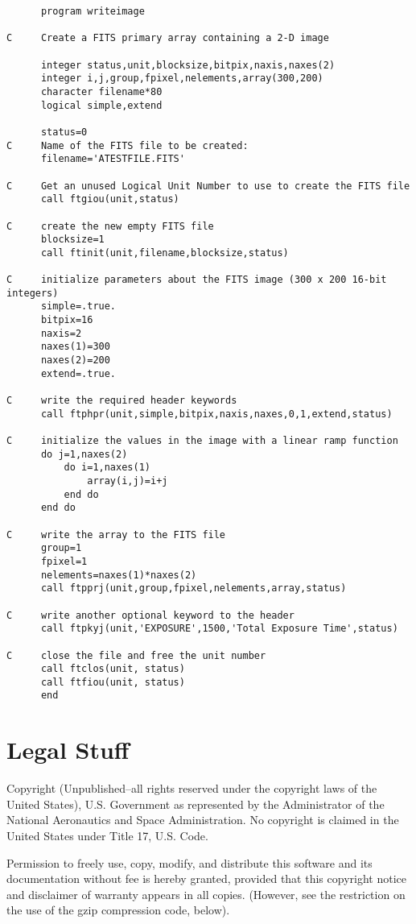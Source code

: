 \documentclass[11pt]{book}
\begin{document}
\begin{verbatim}
      program writeimage

C     Create a FITS primary array containing a 2-D image

      integer status,unit,blocksize,bitpix,naxis,naxes(2)
      integer i,j,group,fpixel,nelements,array(300,200)
      character filename*80
      logical simple,extend

      status=0
C     Name of the FITS file to be created:
      filename='ATESTFILE.FITS'

C     Get an unused Logical Unit Number to use to create the FITS file
      call ftgiou(unit,status)

C     create the new empty FITS file
      blocksize=1
      call ftinit(unit,filename,blocksize,status)

C     initialize parameters about the FITS image (300 x 200 16-bit integers)
      simple=.true.
      bitpix=16
      naxis=2
      naxes(1)=300
      naxes(2)=200
      extend=.true.

C     write the required header keywords
      call ftphpr(unit,simple,bitpix,naxis,naxes,0,1,extend,status)

C     initialize the values in the image with a linear ramp function
      do j=1,naxes(2)
          do i=1,naxes(1)
              array(i,j)=i+j
          end do
      end do

C     write the array to the FITS file
      group=1
      fpixel=1
      nelements=naxes(1)*naxes(2)
      call ftpprj(unit,group,fpixel,nelements,array,status)

C     write another optional keyword to the header
      call ftpkyj(unit,'EXPOSURE',1500,'Total Exposure Time',status)

C     close the file and free the unit number
      call ftclos(unit, status)
      call ftfiou(unit, status)
      end
\end{verbatim}


\section{Legal Stuff}

Copyright (Unpublished--all rights reserved under the copyright laws of
the United States), U.S. Government as represented by the Administrator
of the National Aeronautics and Space Administration.  No copyright is
claimed in the United States under Title 17, U.S. Code.

Permission to freely use, copy, modify, and distribute this software
and its documentation without fee is hereby granted, provided that this
copyright notice and disclaimer of warranty appears in all copies.
(However, see the restriction on the use of the gzip compression code,
below).
\end{document}
